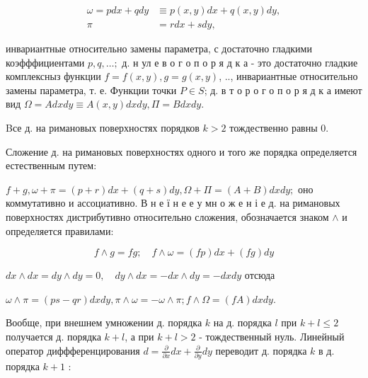 \documentclass[10pt]{article}
\begin{document}
\[

\begin{aligned}

\omega=p d x+q d y & \equiv p(x, y) d x+q(x, y) d y, \\

\pi & =r d x+s d y,

\end{aligned}

\]



инвариантные относительно замены параметра, с достаточно гладкими коэфффициентами $p, q, \ldots ;$ д. н ул е в о г о п о р я д к а - это достаточно гладкие комплексныз функции $f=f(x, y), g=g(x, y)$, .., инвариантные относительно замены параметра, т. е. Функции точки $P \in S$; д. в т о р о г о п о р я д к а имеют вид $\Omega=A d x d y \equiv A(x, y) d x d y, \Pi=B d x d y$.



Bсе д. на римановых поверхностях порядков $k>2$ тождественно равны 0.



Сложение д. на римановых поверхностях одного и того же порядка определяется естественным путем:



$f+g, \omega+\pi=(p+r) d x+(q+s) d y, \Omega+\Pi=(A+B) d x d y ;$ оно коммутативно и ассоциативно. В н е ї н е е у мн о ж е н і е д. на римановых поверхностях дистрибутивно относительно сложения, обозначается знаком $\wedge$ и определяется правилами:



\[

f \wedge g=f g ; \quad f \wedge \omega=(f p) d x+(f g) d y

\]



$d x \wedge d x=d y \wedge d y=0, \quad d y \wedge d x=-d x \wedge d y=-d x d y$ отсюда



$\omega \wedge \pi=(p s-q r) d x d y, \pi \wedge \omega=-\omega \wedge \pi ; f \wedge \Omega=(f A) d x d y$.



Вообще, при внешнем умножении д. порядка $k$ на д. порядка $l$ при $k+l \leqslant 2$ получается д. порядка $k+l$, а при $k+l>2$ - тождественный нуль. Линейный оператор диффференцирования $d=\frac{\partial}{\partial x} d x+\frac{\partial}{\partial y} d y$ переводит д. порядка $k$ в д. порядка $k+1$ :
\end{document}
